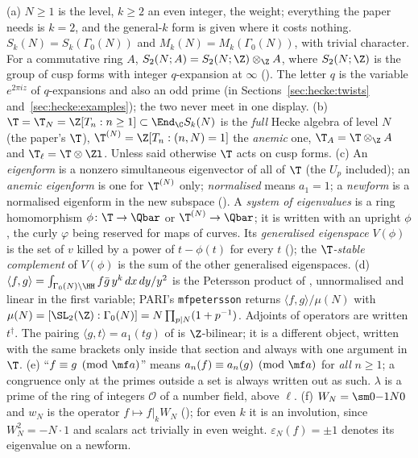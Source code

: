 \begin{convention}\label{conv:hecke:standing}
(a) $N\ge1$ is the level, $k\ge2$ an even integer, the weight; everything the paper needs is $k=2$, and the general-$k$ form is given where it costs nothing.
$S_k(N)=S_k(\Gamma_0(N))$ and $M_k(N)=M_k(\Gamma_0(N))$, with trivial character. For a commutative ring $A$, $S_2(N;A)=S_2(N;\Z)\otimes_\Z A$, where $S_2(N;\Z)$ is the group of
cusp forms with integer $q$-expansion at $\infty$ (). The letter $q$ is the variable $e^{2\pi iz}$ of $q$-expansions and also an odd prime (in
Sections~\ref{sec:hecke:twists} and~\ref{sec:hecke:examples}); the two never meet in one display.
(b) $\T=\T_N=\Z[T_n:n\ge1]\subset\End_\C S_k(N)$ is the \emph{full} Hecke algebra of level $N$ (the paper's $\T$), $\T^{(N)}=\Z[T_n:(n,N)=1]$ the \emph{anemic} one,
$\T_A=\T\otimes_\Z A$ and $\T_\ell=\T\otimes\Zl$. Unless said otherwise $\T$ acts on cusp forms.
(c) An \emph{eigenform} is a nonzero simultaneous eigenvector of all of $\T$ (the $U_p$ included); an \emph{anemic eigenform} is one for $\T^{(N)}$ only; \emph{normalised}
means $a_1=1$; a \emph{newform} is a normalised eigenform in the new subspace (). A \emph{system of eigenvalues} is a ring homomorphism
$\phi\colon\T\to\Qbar$ or $\T^{(N)}\to\Qbar$; it is written with an upright $\phi$, the curly $\varphi$ being reserved for maps of curves. Its \emph{generalised eigenspace}
$V(\phi)$ is the set of $v$ killed by a power of $t-\phi(t)$ for every $t$ (); the \emph{$\T$-stable complement} of $V(\phi)$ is the sum of the other
generalised eigenspaces.
(d) $\langle f,g\rangle=\int_{\Gamma_0(N)\backslash\HH}f\bar g\,y^k\,dx\,dy/y^2$ is the Petersson product of , unnormalised and linear in the first variable; PARI's
\texttt{mfpetersson} returns $\langle f,g\rangle/\mu(N)$ with $\mu(N)=[\SL_2(\Z):\Gamma_0(N)]=N\prod_{p\mid N}(1+p^{-1})$. Adjoints of operators are written $t^\dagger$. The pairing
$\langle g,t\rangle=a_1(tg)$ of  is $\Z$-bilinear; it is a different object, written with the same brackets only inside that section and always
with one argument in $\T$.
(e) ``$f\equiv g\pmod{\mf a}$'' means $a_n(f)\equiv a_n(g)\pmod{\mf a}$ for \emph{all} $n\ge1$; a congruence only at the primes outside a set is always written out as such.
$\lambda$ is a prime of the ring of integers $\mathcal O$ of a number field, above $\ell$.
(f) $W_N=\sm0{-1}N0$ and $w_N$ is the operator $f\mapsto f|_kW_N$ (); for even $k$ it is an involution, since $W_N^2=-N\cdot1$ and scalars act
trivially in even weight. $\varepsilon_N(f)=\pm1$ denotes its eigenvalue on a newform.
\end{convention}

